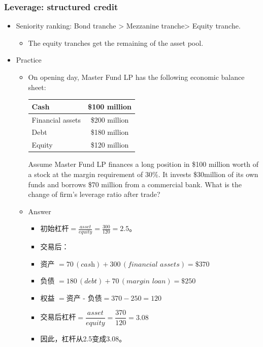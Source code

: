 \subsubsection{Leverage: structured credit}
\begin{itemize}
\item Seniority ranking: Bond tranche > Mezzanine tranche> Equity tranche.
    \begin{itemize}
    \item The equity tranches get the remaining of the asset pool.
    \end{itemize}
\item Practice
    \begin{itemize}
    \item On opening day, Master Fund LP has the following economic balance sheet:
    \begin{table}[htbp]
        \centering
        \begin{tabular}{|l|c|}
        \hline
        Cash & \$100 million \\
        \hline
        Financial assets & \$200 million \\
        \hline
        Debt & \$180 million \\
        \hline
        Equity & \$120 million \\
        \hline
        \end{tabular}
        \end{table}
        Assume Master Fund LP finances a long position in \$100
        million worth of a stock at the margin requirement of 30\%. It
        invests \$30million of its own funds and borrows \$70 million
        from a commercial bank. What is the change of firm's
        leverage ratio after trade?  
    \item Answer  
        \begin{itemize}
        \item 初始杠杆$\displaystyle = \frac{\textit{asset}}{\textit{equity}} = \frac{300}{120} = 2.5$。

        \item 交易后：
        
        \item 资产 $= 70\,(\textit{cash}) + 300\,(\textit{financial assets}) = \$370$
        
        \item 负债 $= 180\,(\textit{debt}) + 70\,(\textit{margin loan}) = \$250$
        
        \item 权益 $= \text{资产 - 负债} = 370 - 250 = 120$
        
        \item 交易后杠杆$\displaystyle = \dfrac{\textit{asset}}{\textit{equity}} = \dfrac{370}{120} = 3.08$
        
        \item 因此，杠杆从2.5变成3.08。
        \end{itemize}
    \end{itemize}
    
\end{itemize}


